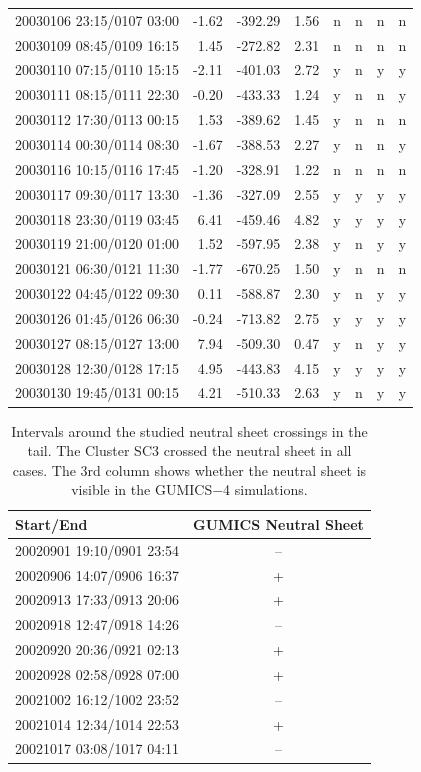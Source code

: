 \documentclass[linenumbers,draft]{agujournal}
\begin{document}
\begin{center}
\begin{longtable}{l|rcc|cccc}
20030106 23:15/0107 03:00 & -1.62 & -392.29 & 1.56 & n & n & n & n \\
20030109 08:45/0109 16:15 & 1.45 & -272.82 &  2.31 & n & n & n & n \\
20030110 07:15/0110 15:15 & -2.11 & -401.03 & 2.72 & y & n & y & y \\
20030111 08:15/0111 22:30 & -0.20 & -433.33 & 1.24 & y & n & n & y \\
20030112 17:30/0113 00:15 & 1.53 & -389.62 & 1.45 & y & n & n & n \\
20030114 00:30/0114 08:30 & -1.67 & -388.53 & 2.27 & y & n & n & y \\
20030116 10:15/0116 17:45 & -1.20 & -328.91 & 1.22 & n & n & n & n \\
20030117 09:30/0117 13:30 & -1.36 & -327.09 & 2.55 & y & y & y & y \\
20030118 23:30/0119 03:45 & 6.41 & -459.46 & 4.82 & y & y & y & y \\
20030119 21:00/0120 01:00 & 1.52 & -597.95 & 2.38 & y & n & y & y \\
20030121 06:30/0121 11:30 & -1.77 & -670.25 & 1.50 & y & n & n & n \\
20030122 04:45/0122 09:30 & 0.11 & -588.87 & 2.30 & y & n & y & y \\
20030126 01:45/0126 06:30 & -0.24 & -713.82 & 2.75 & y & y & y & y \\
20030127 08:15/0127 13:00 & 7.94 & -509.30 & 0.47 & y & n & y & y \\
20030128 12:30/0128 17:15 & 4.95 & -443.83 & 4.15 & y & y & y & y \\
20030130 19:45/0131 00:15 & 4.21 & -510.33 & 2.63 & y & n & y & y \\
\hline
\end{longtable}
\end{center}

\pagebreak

\begin{table}[h]
\setlength{\tabcolsep}{3pt}
\centering
\begin{tabular}{lc}
\hline
Start/End & GUMICS Neutral Sheet\\
\hline
20020901 19:10/0901 23:54 & -- \\
20020906 14:07/0906 16:37 & + \\
20020913 17:33/0913 20:06 & + \\
20020918 12:47/0918 14:26 & -- \\
20020920 20:36/0921 02:13 & + \\
20020928 02:58/0928 07:00 & + \\
20021002 16:12/1002 23:52 & -- \\
20021014 12:34/1014 22:53 & + \\
20021017 03:08/1017 04:11 & -- \\
\hline
\end{tabular}
\caption{Intervals around the studied neutral sheet crossings in the tail. The Cluster SC3 crossed the neutral sheet in all cases. The 3rd column shows whether the neutral sheet is visible in the GUMICS$-$4 simulations. \label{tab:ns}}
\end{table}
\end{document}
